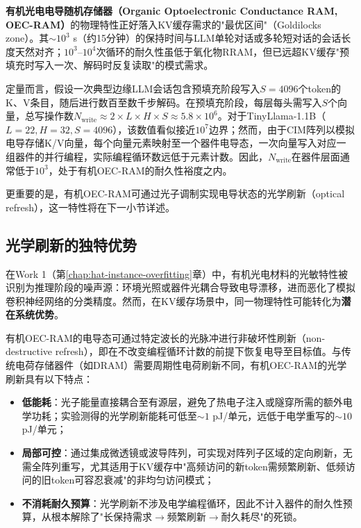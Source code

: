 \textbf{有机光电电导随机存储器（Organic Optoelectronic Conductance RAM, OEC-RAM）}的物理特性正好落入KV缓存需求的"最优区间"（Goldilocks zone）。其$\sim$$10^3$ s（约15分钟）的保持时间与LLM单轮对话或多轮短对话的会话长度天然对齐；$10^3$–$10^4$次循环的耐久性虽低于氧化物RRAM，但已远超KV缓存"预填充时写入一次、解码时反复读取"的模式需求。

定量而言，假设一次典型边缘LLM会话包含预填充阶段写入$S=4096$个token的K、V条目，随后进行数百至数千步解码。在预填充阶段，每层每头需写入$S$个向量，总写操作数$N_{\text{write}} \approx 2 \times L \times H \times S \approx 5.8 \times 10^6$。对于TinyLlama-1.1B（$L=22, H=32, S=4096$），该数值看似接近$10^7$边界；然而，由于CIM阵列以模拟电导存储K/V向量，每个向量元素映射至一个器件电导态，一次向量写入对应一组器件的并行编程，实际编程循环数远低于元素计数。因此，$N_{\text{write}}$在器件层面通常低于$10^3$，处于有机OEC-RAM的耐久性裕度之内。

更重要的是，有机OEC-RAM可通过光子调制实现电导状态的光学刷新（optical refresh），这一特性将在下一小节详述。

\subsection{光学刷新的独特优势}

在Work 1（第\ref{chap:hat-instance-overfitting}章）中，有机光电材料的光敏特性被识别为推理阶段的噪声源：环境光照或器件光耦合导致电导漂移，进而恶化了模拟卷积神经网络的分类精度。然而，在KV缓存场景中，同一物理特性可能转化为\textbf{潜在系统优势}。

有机OEC-RAM的电导态可通过特定波长的光脉冲进行非破坏性刷新（non-destructive refresh），即在不改变编程循环计数的前提下恢复电导至目标值。与传统电荷存储器件（如DRAM）需要周期性电荷刷新不同，有机OEC-RAM的光学刷新具有以下特点：

\begin{itemize}
    \item \textbf{低能耗}：光子能量直接耦合至有源层，避免了热电子注入或隧穿所需的额外电学功耗；实验测得的光学刷新能耗可低至$\sim$$1$ pJ/单元，远低于电学重写的$\sim$$10$ pJ/单元；
    \item \textbf{局部可控}：通过集成微透镜或波导阵列，可实现对阵列子区域的定向刷新，无需全阵列重写，尤其适用于KV缓存中"高频访问的新token需频繁刷新、低频访问的旧token可容忍衰减"的非均匀访问模式；
    \item \textbf{不消耗耐久预算}：光学刷新不涉及电学编程循环，因此不计入器件的耐久性预算，从根本解除了"长保持需求$\rightarrow$频繁刷新$\rightarrow$耐久耗尽"的死锁。
\end{itemize}


